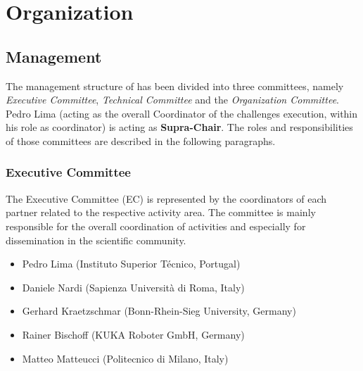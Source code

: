 
\section{\erlir Organization}
\label{sec:RoawOrganization}

\subsection{\erlir Management}
\label{ssec:RoawManagement}

The management structure of \erlir has been divided into three committees, namely \emph{Executive Committee}, \emph{Technical Committee} and the \emph{Organization Committee}. 
Pedro Lima (acting as the overall Coordinator of the challenges execution, within his role as \erl coordinator) is acting as \textbf{Supra-Chair}.
The roles and responsibilities of those committees are described in the following paragraphs.

\subsubsection{\erlir Executive Committee}
\label{sssec:RoawEC}

The Executive Committee (EC) is represented by the coordinators of each \erlir partner related to the respective activity area. 
The committee is mainly responsible for the overall coordination of \erlir activities and especially for dissemination in the scientific community. 
%	
\begin{itemize}	\topsep-12pt\itemsep-2pt
\item Pedro Lima (Instituto Superior T\'ecnico, Portugal)
\item Daniele Nardi (Sapienza Universit\`a di Roma, Italy)
\item Gerhard Kraetzschmar (Bonn-Rhein-Sieg University, Germany)
\item Rainer Bischoff (KUKA Roboter GmbH, Germany)
\item Matteo Matteucci (Politecnico di Milano, Italy)
\end{itemize}


